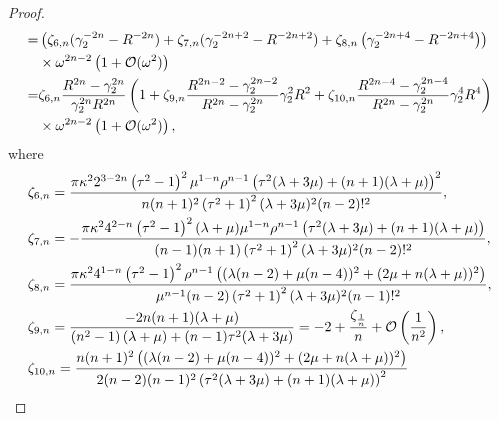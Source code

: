 \documentclass[11pt,reqno,twoside]{amsart}
\theoremstyle{definition}
\theoremstyle{remark}
\numberwithin{equation}{section}
\begin{document}
\begin{proof}
\begin{align}
		=&\left(\zeta _{6,n} (\gamma_2 ^{-2n}-R^{-2n})+\zeta _{7,n} (\gamma_2 ^{-2n+2}-R^{-2n+2})+\zeta _{8,n} \left( \gamma_2 ^{-2n+4}-R^{-2n+4}\right)\right)\notag\\
		& \times  \omega ^{2n-2}\left(1+ \mathcal{O}(\omega^{2})\right)\notag\\
		=&\zeta _{6,n}\frac{R^{2n}-\gamma_2 ^{2n}}{\gamma_2 ^{2n}R^{2n}}\left(1+\zeta _{9,n} \frac{R^{2n-2}-\gamma_{2}^{2n-2}}{R^{2n}-\gamma_2 ^{2n}}\gamma_2 ^{2}R^{2}+\zeta _{10,n} \frac{R^{2n-4}-\gamma_{2}^{2n-4}}{R^{2n}-\gamma_2 ^{2n}}\gamma_2 ^{4}R^{4}\right)\notag\\
		&\times \omega ^{2n-2}\left(1+ \mathcal{O}(\omega^{2})\right),\notag
	\end{align}
	where
	\begin{align}
		&\zeta _{6,n}=\frac{\pi\kappa^2 2^{3-2 n} \left(\tau ^2-1\right)^2 \mu ^{1-n} \rho ^{n-1} \left(\tau ^2 (\lambda +3 \mu )+(n+1) (\lambda +\mu )\right)^2}{n(n+1)^2 \left(\tau ^2+1\right)^2 (\lambda +3 \mu )^2  (n-2)!^2},\notag\\
		&\zeta_{7,n}=-\frac{\pi\kappa^2 4^{2-n} \left(\tau ^2-1\right)^2 (\lambda +\mu ) \mu ^{1-n} \rho ^{n-1} \left(\tau ^2 (\lambda +3 \mu )+(n+1) (\lambda +\mu )\right)}{(n-1)(n+1) \left(\tau ^2+1\right)^2 (\lambda +3 \mu )^2  (n-2)!^2},\notag\\
		&\zeta_{8,n}=\frac{\pi\kappa^2 4^{1-n} \left(\tau ^2-1\right)^2 \rho ^{n-1} \left((\lambda  (n-2)+\mu  (n-4))^2+(2 \mu +n (\lambda +\mu ))^2\right)}{\mu ^{n-1} (n-2)\left(\tau ^2+1\right)^2 (\lambda +3 \mu )^2 (n-1)!^2},\notag\\
		&\zeta _{9,n}=\frac{-2 n (n+1) (\lambda +\mu )}{\left(n^2-1\right) (\lambda +\mu )+(n-1) \tau ^2 (\lambda +3 \mu )}=-2+\frac{\zeta_{\frac{1}{n}}}{n}+\mathcal{O}\left(\frac{1}{n^2}\right),\notag\\
		&\zeta _{10,n}=\frac{n (n+1)^2 \left((\lambda  (n-2)+\mu  (n-4))^2+(2 \mu +n (\lambda +\mu ))^2\right)}{2 (n-2) (n-1)^2 \left(\tau ^2 (\lambda +3 \mu )+(n+1) (\lambda +\mu )\right)^2}\notag\\

\end{align}
\end{proof}
\end{document}
